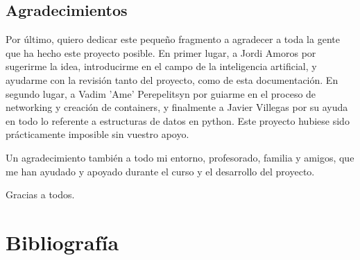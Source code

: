 \documentclass{article}
\begin{document}
\subsection{Agradecimientos}
\label{sec:Thanks}
Por último, quiero dedicar este pequeño fragmento a agradecer a toda la gente que ha hecho este proyecto posible. En primer lugar, a Jordi Amoros por sugerirme la idea, introducirme en el campo de la inteligencia artificial, y ayudarme con la revisión tanto del proyecto, como de esta documentación. En segundo lugar, a Vadim 'Ame' Perepelitsyn por guiarme en el proceso de networking y creación de containers, y finalmente a Javier Villegas por su ayuda en todo lo referente a estructuras de datos en python. Este proyecto hubiese sido prácticamente imposible sin vuestro apoyo.

Un agradecimiento también a todo mi entorno, profesorado, familia y amigos, que me han ayudado y apoyado durante el curso y el desarrollo del proyecto.

Gracias a todos.

\newpage

\section{Bibliografía}
\label{sec:bib}
\end{document}
